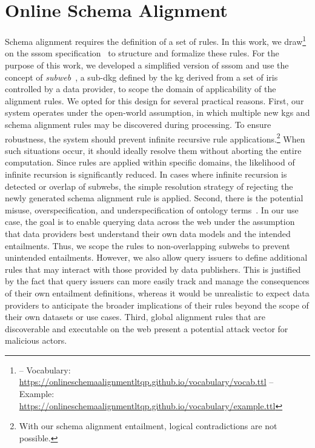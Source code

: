 \section{Online Schema Alignment}\label{sec:method}

Schema alignment requires the definition of a set of rules.
In this work, we draw\footnote{-- Vocabulary: \url{https://onlineschemaalignmentltqp.github.io/vocabulary/vocab.ttl} -- Example: \url{https://onlineschemaalignmentltqp.github.io/vocabulary/example.ttl}}
on the \gls{sssom} specification~\cite{sssom_website, matentzoglu2022simple} to structure and formalize these rules. %
For the purpose of this work, we developed a simplified version of \gls{sssom} and use the concept of \emph{subweb}~\cite{traveling_map_ltqp}, a sub-\gls{dkg} defined by the \gls{kg} derived from a set of \glspl{iri} controlled by a data provider, to scope the domain of applicability of the alignment rules.
We opted for this design for several practical reasons.
First, our system operates under the open-world assumption, in which multiple new \glspl{kg} and schema alignment rules may be discovered during processing.
To ensure robustness, the system should prevent infinite recursive rule applications.\footnote{With our schema alignment entailment, logical contradictions are not possible.}
When such situations occur, it should ideally resolve them without aborting the entire computation.
Since rules are applied within specific domains, the likelihood of infinite recursion is significantly reduced.
In cases where infinite recursion is detected or overlap of subwebs, the simple resolution strategy of rejecting the newly generated schema alignment rule is applied.
Second, there is the potential misuse, overspecification, and underspecification of ontology terms~\cite{abedjan2012reconciling, lorey2011rdf}.
In our use case, the goal is to enable querying data across the web under the assumption that data providers best understand their own data models and the intended entailments.
Thus, we scope the rules to non-overlapping subwebs to prevent unintended entailments.
However, we also allow query issuers to define additional rules that may interact with those provided by data publishers.
This is justified by the fact that query issuers can more easily track and manage the consequences of their own entailment definitions, whereas it would be unrealistic to expect data providers to anticipate the broader implications of their rules beyond the scope of their own datasets or use cases.
Third, global alignment rules that are discoverable and executable on the web present a potential attack vector for malicious actors.

